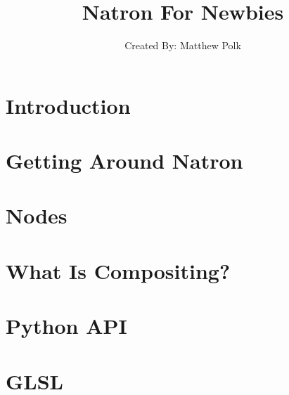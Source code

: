 \documentclass[12pt, oneside, openany, showtrims, letterpaper]{memoir}
\title{Natron For Newbies}
\author{Created By: Matthew Polk}
\date{}
\begin{document}
\maketitle

\newpage
\tableofcontents*
\pagestyle{empty}


\cleardoublepage

%
\setcounter{page}{1}
\chapter{Introduction}

\chapter{Getting Around Natron}

\chapter{Nodes}

\chapter{What Is Compositing?}

\chapter{Python API}

\chapter{GLSL}
\end{document}
